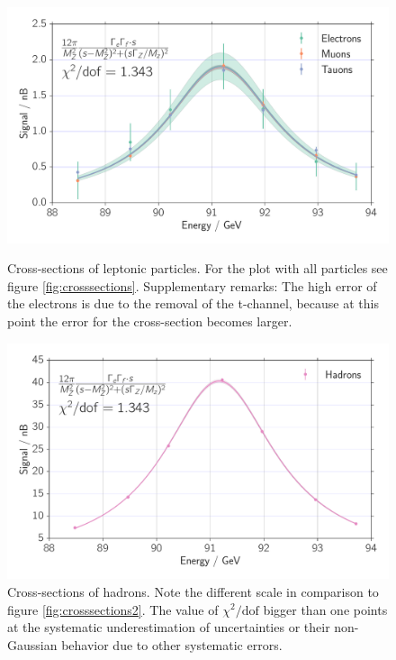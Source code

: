 \begin{figure}[htpb]
    \centering
    \includegraphics[width=1.0\linewidth]{figures/crosssections2}
    \caption{Cross-sections of leptonic particles. For the plot with all particles see figure \ref{fig:crosssections}.
        Supplementary remarks: The high error of the electrons is due to the removal of the t-channel, because at this point
    the error for the cross-section becomes larger.}
    \label{fig:crosssections2}
    \includegraphics[width=1.0\linewidth]{figures/crosssections_h}
    \caption{Cross-sections of hadrons. Note the different scale in comparison to figure \ref{fig:crosssections2}.
    The value of $\chi^2/\mathrm{dof}$ bigger than one points at the systematic underestimation
    of uncertainties or their non-Gaussian behavior due to other systematic errors.}
    \label{fig:crosssections_h}
\end{figure}

